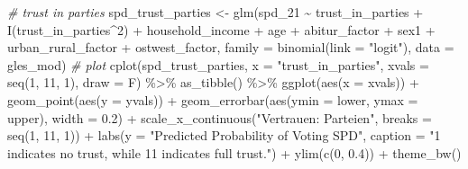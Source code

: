 \documentclass[
]{article}
\newenvironment{Shaded}{\begin{snugshade}}{\end{snugshade}}
\newcommand{\AttributeTok}[1]{\textcolor[rgb]{0.77,0.63,0.00}{#1}}
\newcommand{\CommentTok}[1]{\textcolor[rgb]{0.56,0.35,0.01}{\textit{#1}}}
\newcommand{\DecValTok}[1]{\textcolor[rgb]{0.00,0.00,0.81}{#1}}
\newcommand{\FloatTok}[1]{\textcolor[rgb]{0.00,0.00,0.81}{#1}}
\newcommand{\FunctionTok}[1]{\textcolor[rgb]{0.00,0.00,0.00}{#1}}
\newcommand{\NormalTok}[1]{#1}
\newcommand{\OtherTok}[1]{\textcolor[rgb]{0.56,0.35,0.01}{#1}}
\newcommand{\SpecialCharTok}[1]{\textcolor[rgb]{0.00,0.00,0.00}{#1}}
\newcommand{\StringTok}[1]{\textcolor[rgb]{0.31,0.60,0.02}{#1}}
\begin{document}
\begin{Shaded}
\begin{Highlighting}[]
\CommentTok{\# trust in parties }
\NormalTok{spd\_trust\_parties }\OtherTok{\textless{}{-}} \FunctionTok{glm}\NormalTok{(spd\_21 }\SpecialCharTok{\textasciitilde{}}\NormalTok{ trust\_in\_parties }\SpecialCharTok{+} \FunctionTok{I}\NormalTok{(trust\_in\_parties}\SpecialCharTok{\^{}}\DecValTok{2}\NormalTok{) }\SpecialCharTok{+}\NormalTok{ household\_income }\SpecialCharTok{+}\NormalTok{ age }\SpecialCharTok{+}\NormalTok{ abitur\_factor }\SpecialCharTok{+}\NormalTok{ sex1 }\SpecialCharTok{+}\NormalTok{ urban\_rural\_factor }\SpecialCharTok{+}\NormalTok{ ostwest\_factor, }\AttributeTok{family =} \FunctionTok{binomial}\NormalTok{(}\AttributeTok{link =} \StringTok{"logit"}\NormalTok{), }\AttributeTok{data =}\NormalTok{ gles\_mod)}
\CommentTok{\# plot }
\FunctionTok{cplot}\NormalTok{(spd\_trust\_parties, }\AttributeTok{x =} \StringTok{"trust\_in\_parties"}\NormalTok{, }
      \AttributeTok{xvals =} \FunctionTok{seq}\NormalTok{(}\DecValTok{1}\NormalTok{, }\DecValTok{11}\NormalTok{, }\DecValTok{1}\NormalTok{), }\AttributeTok{draw =}\NormalTok{ F) }\SpecialCharTok{\%\textgreater{}\%}
  \FunctionTok{as\_tibble}\NormalTok{() }\SpecialCharTok{\%\textgreater{}\%}
  \FunctionTok{ggplot}\NormalTok{(}\FunctionTok{aes}\NormalTok{(}\AttributeTok{x =}\NormalTok{ xvals)) }\SpecialCharTok{+}
  \FunctionTok{geom\_point}\NormalTok{(}\FunctionTok{aes}\NormalTok{(}\AttributeTok{y =}\NormalTok{ yvals)) }\SpecialCharTok{+}
  \FunctionTok{geom\_errorbar}\NormalTok{(}\FunctionTok{aes}\NormalTok{(}\AttributeTok{ymin =}\NormalTok{ lower, }\AttributeTok{ymax =}\NormalTok{ upper), }\AttributeTok{width =} \FloatTok{0.2}\NormalTok{) }\SpecialCharTok{+}
  \FunctionTok{scale\_x\_continuous}\NormalTok{(}\StringTok{"Vertrauen: Parteien"}\NormalTok{, }
                     \AttributeTok{breaks =} \FunctionTok{seq}\NormalTok{(}\DecValTok{1}\NormalTok{, }\DecValTok{11}\NormalTok{, }\DecValTok{1}\NormalTok{)) }\SpecialCharTok{+}
  \FunctionTok{labs}\NormalTok{(}\AttributeTok{y =} \StringTok{"Predicted Probability of Voting SPD"}\NormalTok{, }
       \AttributeTok{caption =} \StringTok{"\textquotesingle{}1\textquotesingle{} indicates \textquotesingle{}no trust\textquotesingle{}, while 11 indicates \textquotesingle{}full trust\textquotesingle{}."}\NormalTok{) }\SpecialCharTok{+}
  \FunctionTok{ylim}\NormalTok{(}\FunctionTok{c}\NormalTok{(}\DecValTok{0}\NormalTok{, }\FloatTok{0.4}\NormalTok{)) }\SpecialCharTok{+}
  \FunctionTok{theme\_bw}\NormalTok{()}
\end{Highlighting}
\end{Shaded}
\end{document}
